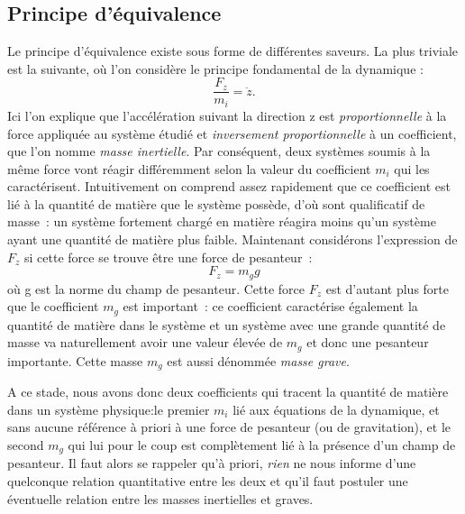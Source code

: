 \subsection{Principe d'équivalence}
Le principe d'équivalence existe sous forme de différentes saveurs. La plus triviale est la suivante, où l'on considère le principe fondamental de la dynamique :
\begin{equation}
\frac{F_z}{m_i}=\ddot z.
\end{equation}
Ici l'on explique que l'accélération suivant la direction z est \textit{proportionnelle} à la force appliquée au système étudié et \textit{inversement proportionnelle} à un coefficient, que l'on nomme \textit{masse inertielle}. Par conséquent, deux systèmes soumis à la même force vont réagir différemment selon la valeur du coefficient $m_i$ qui les caractérisent. Intuitivement on comprend assez rapidement que ce coefficient est lié à la quantité de matière que le système possède, d'où sont qualificatif de masse~: un système fortement chargé en matière réagira moins qu'un système ayant une quantité de matière plus faible. Maintenant considérons l'expression de $F_z$ si cette force se trouve être une force de pesanteur~:
\begin{equation}
F_z=m_g g
\end{equation}
où g est la norme du champ de pesanteur. Cette force $F_z$ est d'autant plus forte que le coefficient $m_g$ est important~: ce coefficient caractérise également la quantité de matière dans le système et un système avec une grande quantité de masse va naturellement avoir une valeur élevée de $m_g$ et donc une pesanteur importante. Cette masse $m_g$ est aussi dénommée \textit{masse grave}.

A ce stade, nous avons donc deux coefficients qui tracent la quantité de matière dans un système physique:le premier $m_i$ lié aux équations de la dynamique, et sans aucune référence à priori à une force de pesanteur (ou de gravitation),  et le second $m_g$ qui lui pour le coup est complètement lié à la présence d'un champ de pesanteur. Il faut alors se rappeler qu'à priori, \textit{rien} ne nous informe d'une quelconque relation quantitative entre les deux et qu'il faut postuler une éventuelle relation entre les masses inertielles et graves.


